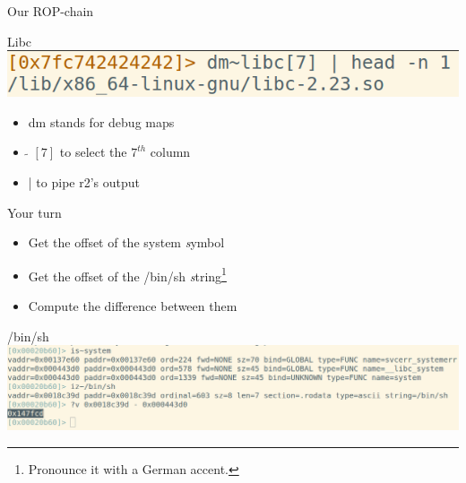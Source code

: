 \documentclass{beamer}
\begin{document}
\begin{frame}{Our ROP-chain}
\end{frame}


\begin{frame}{Libc}
    \includegraphics[width=\textwidth]{r0pbaby_dm.png}
    \begin{itemize}
        \item \alert{dm} stands for \alert{d}ebug \alert{m}aps
        \item \alert{$\tilde{}$ $[7]$} to select the $7^{th}$ column
        \item \alert{|} to pipe r2's output
    \end{itemize}
\end{frame}

\begin{frame}{Your turn}
    \begin{center}
        \Large
        \begin{itemize}
            \item Get the offset of the \alert{system} \emph{s}ymbol
            \item Get the offset of the \alert{/bin/sh} \emph{s}tring\footnote{Pronounce it with a German accent.}
            \item Compute the difference between them
        \end{itemize}
    \end{center}
\end{frame}

\begin{frame}{/bin/sh}
    \includegraphics[width=1.1\textwidth]{r0pbaby_binsh.png}
\end{frame}
\end{document}
